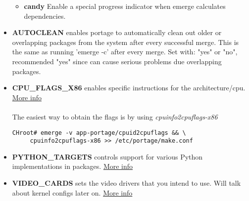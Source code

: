 \documentclass[10pt,a4paper]{article}
\begin{document}
\begin{itemize}
\begin{itemize}[label={o}]
                        \item \textbf{candy} Enable a special progress indicator when emerge calculates dependencies.

                    \end{itemize}

                    \item \textbf{AUTOCLEAN} enables portage to automatically clean out older or overlapping packages from the system after every successful merge. This is the same as running 'emerge -c' after every merge. Set with: "yes" or "no", recommended "yes" since can cause serious problems due overlapping packages.



                    \item \textbf{CPU\_FLAGS\_X86} enables specific instructions for the architecture/cpu. \href{https://wiki.gentoo.org/wiki/CPU_FLAGS_X86}{More info}



                        \paragraph{} The easiest way to obtain the flags is by using \textit{cpuinfo2cpuflags-x86}

\begin{lstlisting}[style=BashInputCHRoot]
 CHroot# emerge -v app-portage/cpuid2cpuflags && \
     cpuinfo2cpuflags-x86 >> /etc/portage/make.conf
\end{lstlisting}

                    \item \textbf{PYTHON\_TARGETS} controls support for various Python implementations in packages. \href{https://wiki.gentoo.org/wiki/Project:Python/PYTHON_TARGETS}{More info}



                    \item \textbf{VIDEO\_CARDS} sets the video drivers that you intend to use. Will talk about kernel configs later on. \href{https://wiki.gentoo.org/wiki/Xorg/Guide#make.conf}{More info}




\end{itemize}
\end{document}
